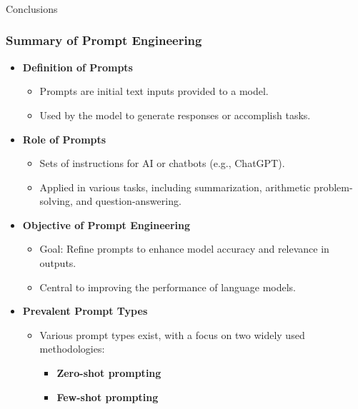 \begin{frame}[fragile]\frametitle{}
\begin{center}
{\Large Conclusions}
\end{center}
\end{frame}


\begin{frame}[fragile]\frametitle{Summary of Prompt Engineering}

\begin{itemize}
  \item \textbf{Definition of Prompts}
    \begin{itemize}
      \item Prompts are initial text inputs provided to a model.
      \item Used by the model to generate responses or accomplish tasks.
    \end{itemize}

  \item \textbf{Role of Prompts}
    \begin{itemize}
      \item Sets of instructions for AI or chatbots (e.g., ChatGPT).
      \item Applied in various tasks, including summarization, arithmetic problem-solving, and question-answering.
    \end{itemize}

  \item \textbf{Objective of Prompt Engineering}
    \begin{itemize}
      \item Goal: Refine prompts to enhance model accuracy and relevance in outputs.
      \item Central to improving the performance of language models.
    \end{itemize}

  \item \textbf{Prevalent Prompt Types}
    \begin{itemize}
      \item Various prompt types exist, with a focus on two widely used methodologies:
        \begin{itemize}
          \item \textbf{Zero-shot prompting}
          \item \textbf{Few-shot prompting}
        \end{itemize}
    \end{itemize}
\end{itemize}

\end{frame}


